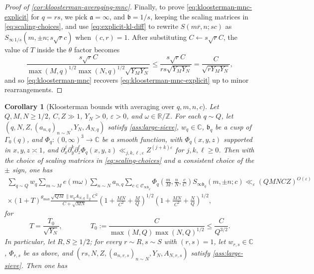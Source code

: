 \documentclass[reqno,11pt]{amsart}
\newtheorem{corollary}[theorem]{Corollary}
\theoremstyle{remark}
\numberwithin{equation}{section}
\newcommand{\Z}{\mathbb{Z}}
\newcommand{\R}{\mathbb{R}}
\newcommand{\C}{\mathbb{C}}
\newcommand{\mC}{\mathcal{C}}
\newcommand{\ma}{\mathfrak{a}}
\newcommand{\mb}{\mathfrak{b}}
\newcommand{\eps}{\varepsilon}
\renewcommand{\bar}{\overline}
\begin{document}
\begin{proof}[Proof of \cref{cor:kloosterman-averaging-mnc}]
Finally, to prove \cref{eq:kloosterman-mnc-explicit} for $q = rs$,
we pick $\ma = \infty$, and $\mb = 1/s$, keeping the scaling matrices in \cref{eq:scaling-choices}, and use \cref{eq:explicit-kl-diff} to rewrite $S(m\bar{r}, n; sc)$ as $S_{\infty\,1/s}(m, \pm n; s\sqrt{r}c)$ when $(c, r) = 1$. After substituting $C \gets s\sqrt{r}C$, the value of $T$ inside the $\theta$ factor becomes
\[
    \frac{s\sqrt{r} C}{\max(M, q)^{1/2} \max(N, q)^{1/2} \sqrt{Y_MY_N}}
    \le 
    \frac{s\sqrt{r} C}{rs \sqrt{Y_M Y_N}} = 
    \frac{C}{\sqrt{rY_MY_N}},
\]
and so \cref{eq:kloosterman-mnc} recovers \cref{eq:kloosterman-mnc-explicit} up to minor rearrangements.
\end{proof}



\begin{corollary}[Kloosterman bounds with averaging over $q, m, n, c$] \label{cor:kloosterman-averaging-qmnc}
Let $Q, M, N \ge 1/2$, $C, Z \gg 1$, $Y_N > 0$, $\eps > 0$, and $\omega \in \R/\Z$. For each $q \sim Q$, let $(q, N, Z, (a_{n,q})_{n \sim N}, Y_N, A_{N,q})$ satisfy \cref{ass:large-sieve}, $w_q \in \C$, $\mb_q$ be a cusp of $\Gamma_0(q)$, and $\Phi_q : (0, \infty)^3 \to \C$ be a smooth function, with $\Phi_q(x, y, z)$ supported in $x, y, z \asymp 1$, and $\partial_x^j \partial_y^k \partial_z^\ell \Phi_q(x, y, z) \ll_{j,k,\ell,\eps} Z^{(j+k)\eps}$ for $j, k, \ell \ge 0$. Then with the choice of scaling matrices in \cref{eq:scaling-choices} and a consistent choice of the $\pm$ sign, one has
\begin{equation} \label{eq:kloosterman-qmnc}
\begin{aligned}
    \sum_{q \sim Q} w_q
    \sum_{m \sim M} e(m\omega)
    \sum_{n \sim N} a_{n,q}
    \sum_{c \in \mC_{\infty\mb_q}} \Phi_q\left(\frac{m}{M}, \frac{n}{N}, \frac{c}{C}\right) S_{\infty\mb_q}(m, \pm n; c)
    \ll_\eps
    (QMNCZ)^{O(\eps)}
    \\
    \times 
    \left(1 + T\right)^{\theta_{\max}}
    \frac{\sqrt{QM} \|w_q A_{N,q}\|_2 C^2}{C + \sqrt{MN}} 
    \left(1 + \frac{MN}{C^2} + \frac{M}{Q} \right)^{1/2}
    \left(1 + \frac{MN}{C^2} + \frac{N}{Q}\right)^{1/2},
\end{aligned}
\end{equation}
for
\[
    T = \frac{T_0}{\sqrt{Y_N}}, 
    \qquad\qquad 
    T_0 := \frac{C}{\max\left(M, Q \right) \max\left(N, Q\right)^{1/2}}
    \le
    \frac{C}{Q^{3/2}}.
\]
In particular, let $R, S \ge 1/2$; for every $r \sim R, s \sim S$ with $(r, s) = 1$, let $w_{r,s} \in \C$, $\Phi_{r,s}$ be as above, and $(rs, N, Z, (a_{n,r,s})_{n \sim N}, Y_N, A_{N,r,s})$ satisfy \cref{ass:large-sieve}. Then one has 

\end{corollary}
\end{document}
